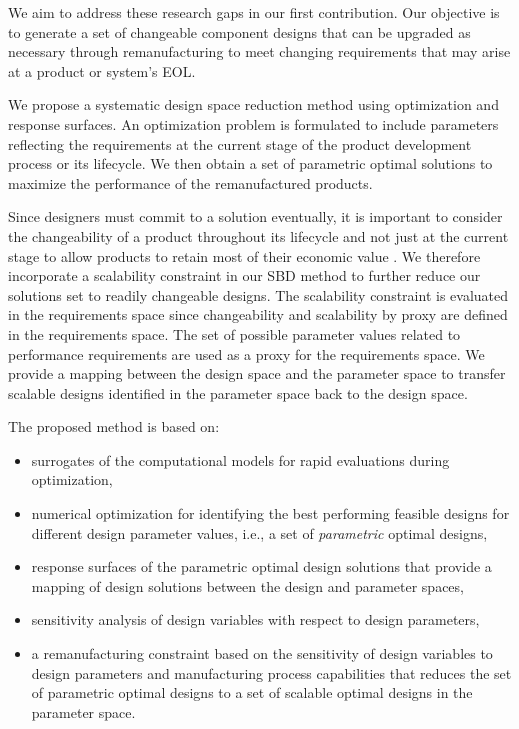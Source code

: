 We aim to address these research gaps in our first contribution. Our objective is to generate a set of changeable component designs that can be upgraded as necessary through remanufacturing to meet changing requirements that may arise at a product or system's \ac{EOL}. 

We propose a systematic design space reduction method using optimization and response surfaces. An optimization problem is formulated to include parameters reflecting the requirements at the current stage of the product development process or its lifecycle. We then obtain a set of parametric optimal solutions to maximize the performance of the remanufactured products. 

Since designers must commit to a solution eventually, it is important to consider the {changeability} of a product throughout its lifecycle and not just at the current stage to allow products to retain most of their economic value \cite{Fricke2005}. We therefore incorporate a scalability constraint in our \ac{SBD} method to further reduce our solutions set to readily changeable designs. The scalability constraint is evaluated in the requirements space since changeability and scalability by proxy are defined in the requirements space. The set of possible parameter values related to performance requirements are used as a proxy for the requirements space. We provide a mapping between the design space and the parameter space to transfer scalable designs identified in the parameter space back to the design space.

The proposed method is based on:
\begin{itemize}
	\item surrogates of the computational models for rapid evaluations during optimization,
	\item numerical optimization for identifying the best performing feasible designs for different design parameter values, i.e., a set of \textit{parametric} optimal designs,%
	\item response surfaces of the parametric optimal design solutions that provide a mapping of design solutions between the design and parameter spaces,
	\item sensitivity analysis of design variables with respect to design parameters,
	\item a remanufacturing constraint based on the sensitivity of design variables to design parameters and manufacturing process capabilities that reduces the set of parametric optimal designs to a set of {scalable} optimal designs in the parameter space.
\end{itemize}

